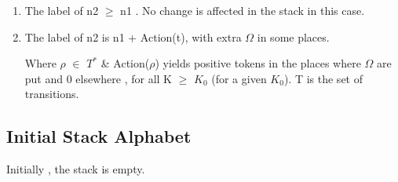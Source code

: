 \documentclass[a4paper,10pt]{article}
\begin{document}
\begin{enumerate}
\begin{center}
      \end{center}
        
   
   \item
      The label of n2  $\geq$ n1 . No change is affected in the stack in this case. 
      \begin{center}

      \end{center} 
   
   
   
   
   
   
   
   
   
   
   
   
   
   
   \item
      The label of n2 is n1 + Action(t), with extra $\Omega$ in some places. 
      
      \begin{center}

      \end{center}
       Where $\rho$ $\in$ $T^{\ast}$ \& Action($\rho$) yields positive tokens in the 
       places where $\Omega$ are put and 0 elsewhere , \newline 
       for all K $\geq$ $K_{0}$ (for a given $K_{0}$).
       \newline
       T is the set of transitions. 
      
       \end{enumerate}
   
   
   \subsection{Initial Stack Alphabet}
    Initially , the stack is empty.    

    
    
\end{document}
